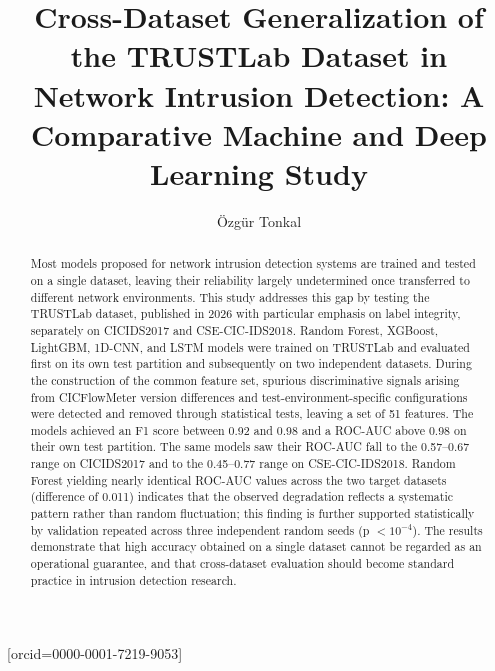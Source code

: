 \documentclass[a4paper,fleqn]{cas-sc}
\begin{document}
\let\WriteBookmarks\relax
\def\floatpagepagefraction{1}
\def\textpagefraction{.001}


\title [mode = title]{Cross-Dataset Generalization of the TRUSTLab Dataset in Network Intrusion Detection: A Comparative Machine and Deep Learning Study}

\author[1]{\texorpdfstring{Özgür Tonkal}{Ozgur Tonkal}}[orcid=0000-0001-7219-9053]

\cormark[1]





\begin{abstract}
Most models proposed for network intrusion detection systems are trained and tested on a single dataset, leaving their reliability largely undetermined once transferred to different network environments. This study addresses this gap by testing the TRUSTLab dataset, published in 2026 with particular emphasis on label integrity, separately on CICIDS2017 and CSE-CIC-IDS2018. Random Forest, XGBoost, LightGBM, 1D-CNN, and LSTM models were trained on TRUSTLab and evaluated first on its own test partition and subsequently on two independent datasets. During the construction of the common feature set, spurious discriminative signals arising from CICFlowMeter version differences and test-environment-specific configurations were detected and removed through statistical tests, leaving a set of 51 features. The models achieved an F1 score between 0.92 and 0.98 and a ROC-AUC above 0.98 on their own test partition. The same models saw their ROC-AUC fall to the 0.57--0.67 range on CICIDS2017 and to the 0.45--0.77 range on CSE-CIC-IDS2018. Random Forest yielding nearly identical ROC-AUC values across the two target datasets (difference of 0.011) indicates that the observed degradation reflects a systematic pattern rather than random fluctuation; this finding is further supported statistically by validation repeated across three independent random seeds (p $< 10^{-4}$). The results demonstrate that high accuracy obtained on a single dataset cannot be regarded as an operational guarantee, and that cross-dataset evaluation should become standard practice in intrusion detection research.
\end{abstract}
\end{document}
